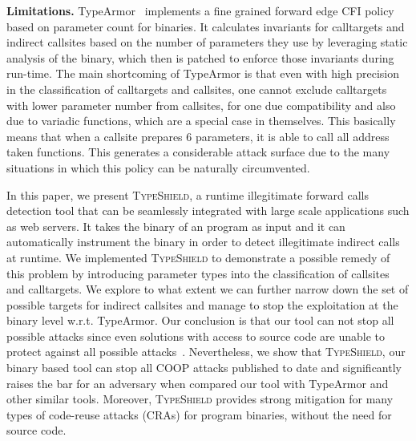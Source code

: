 \textbf{Limitations.} TypeArmor~\cite{veen:typearmor} implements a fine grained forward edge CFI 
policy based on parameter count for binaries. It calculates invariants for calltargets and indirect callsites based on
the number of parameters they use by leveraging static analysis of the binary, which then is
patched to enforce those invariants during run-time. The main shortcoming of TypeArmor is that
even with high precision in the classification of 
calltargets and callsites, one cannot exclude calltargets with lower parameter number from 
callsites, for one due compatibility and also due to variadic functions, which are a special
case in themselves. This basically means that when a callsite prepares 6 parameters, it is 
able to call all address taken functions. This generates a considerable attack surface due to the many
situations in which this policy can be naturally circumvented.

In this paper, we present \textsc{TypeShield}, a runtime illegitimate forward 
calls detection tool that can be seamlessly integrated with large scale applications such as web servers.
It takes the binary of an program as input and it can automatically instrument the binary in order
to detect illegitimate indirect calls at runtime. 
We implemented \textsc{TypeShield} to demonstrate a possible remedy of this problem by introducing
parameter types into the classification of callsites and calltargets. We explore to
what extent we can further narrow down the set of possible targets for indirect callsites
and manage to stop the exploitation at the binary level w.r.t. TypeArmor.
Our conclusion is that our tool can not stop all possible attacks since even solutions 
with access to source code are unable to protect against all possible attacks~\cite{carlini:bending}.
Nevertheless, we show that \textsc{TypeShield}, our binary based tool can stop all 
COOP attacks published to date and significantly raises the bar for an adversary when compared our tool with 
TypeArmor and other similar tools. 
Moreover, \textsc{TypeShield} provides strong mitigation for many types of code-reuse attacks
(CRAs) for program binaries, without the need for source code. 

